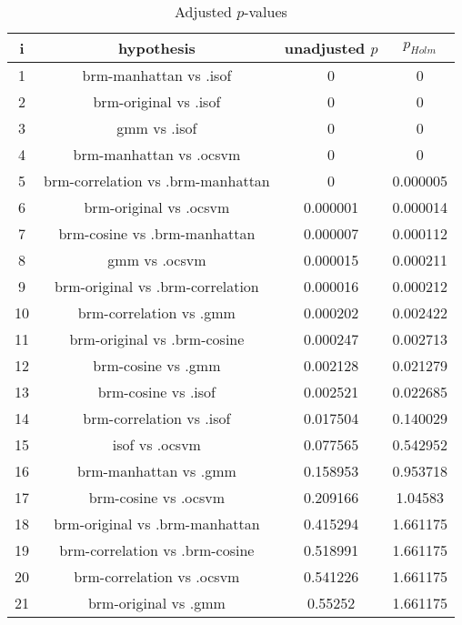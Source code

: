 \documentclass[a4paper,10pt]{article}
\begin{document}
\begin{landscape}
\begin{table}[!htp]
\centering\scriptsize
\begin{tabular}{cccc}
i&hypothesis&unadjusted $p$&$p_{Holm}$\\
\hline1&brm-manhattan vs .isof&0&0\\
2&brm-original vs .isof&0&0\\
3&gmm vs .isof&0&0\\
4&brm-manhattan vs .ocsvm&0&0\\
5&brm-correlation vs .brm-manhattan&0&0.000005\\
6&brm-original vs .ocsvm&0.000001&0.000014\\
7&brm-cosine vs .brm-manhattan&0.000007&0.000112\\
8&gmm vs .ocsvm&0.000015&0.000211\\
9&brm-original vs .brm-correlation&0.000016&0.000212\\
10&brm-correlation vs .gmm&0.000202&0.002422\\
11&brm-original vs .brm-cosine&0.000247&0.002713\\
12&brm-cosine vs .gmm&0.002128&0.021279\\
13&brm-cosine vs .isof&0.002521&0.022685\\
14&brm-correlation vs .isof&0.017504&0.140029\\
15&isof vs .ocsvm&0.077565&0.542952\\
16&brm-manhattan vs .gmm&0.158953&0.953718\\
17&brm-cosine vs .ocsvm&0.209166&1.04583\\
18&brm-original vs .brm-manhattan&0.415294&1.661175\\
19&brm-correlation vs .brm-cosine&0.518991&1.661175\\
20&brm-correlation vs .ocsvm&0.541226&1.661175\\
21&brm-original vs .gmm&0.55252&1.661175\\
\hline
\end{tabular}
\caption{Adjusted $p$-values}
\end{table}

\end{landscape}
\end{document}
